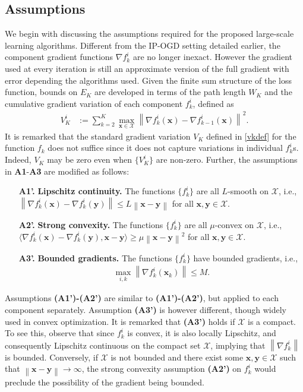 \documentclass[draftcls,onecolumn,12pt]{IEEEtran}
\theoremstyle{plain}
\def\x{\mathbf{x}}
\def\y{\mathbf{y}}
\def\cX {\mathcal{X}}
\providecommand{\norm}[1]{\left\|#1\right\|}
\providecommand{\ip}[1]{\langle#1\rangle}
\theoremstyle{plain}
\theoremstyle{remark}
\begin{document}
\subsection{Assumptions}
We begin with discussing the assumptions required for the proposed large-scale learning algorithms. Different from the IP-OGD setting detailed earlier, the component gradient functions $\nabla f_k^i$ are no longer inexact. However the gradient used at every iteration is still an approximate version of the full gradient with error depending the algorithms used. Given the finite sum structure of the loss function, bounds on $E_K$ are developed in terms of the path length $W_K$ and the cumulative gradient variation of each component $f_k^i$, defined as
\begin{align}\label{vki}
V_K^i&:=\sum\limits_{k=2}^{K}\max_{\x \in \cX}\norm{\nabla f_k^i(\x)-\nabla f_{k-1}^i(\x)}^2.
\end{align}
It is remarked that the standard gradient variation $V_K$ defined in \eqref{vkdef} for the function $f_k$ does not suffice since it does not capture variations in individual $f_k^i$s. Indeed, $V_K$ may be zero even when $\{V_K^i\}$ are non-zero. Further, the assumptions in \textbf{A1}-\textbf{A3} are modified as follows: 
\begin{itemize}
	\item[\textbf{A1'.}] \textbf{Lipschitz continuity.} The functions $\{f_k^i\}$ are all $L$-smooth on $\cX$, i.e., $\norm{\nabla f_k^i(\x)-\nabla f_k^i(\y)} \leq L\norm{\x-\y}$ for all $\x,\y \in \cX$.  
	\item[\textbf{A2'.}] \textbf{Strong convexity.} The functions $\{f_k^i\}$ are all  $\mu$-convex on $\cX$, i.e., $\ip{\nabla f_k^i(\x)-\nabla f_k^i(\y),\x-\y} \geq \mu\norm{\x-\y}^2$ for all $\x,\y \in \cX$.
	\item[\textbf{A3'.}] \textbf{Bounded gradients.} The functions $\{f_k^i\}$ have bounded gradients, i.e., 
	\begin{align}\label{eq:BVg}
	\max_{i,k}\norm{\nabla f_{k}^{i}(\x_k)} \leq M. 
	\end{align}
\end{itemize}
Assumptions \textbf{(A1')-(A2')} are similar to \textbf{(A1')-(A2')}, but applied to each component separately. Assumption \textbf{(A3')} is however different, though widely used in convex optimization. It is remarked that \textbf{(A3')} holds if $\cX$ is a compact. To see this, observe that since $f_k^i$ is convex, it is also locally Lipschitz, and consequently Lipschitz continuous on the compact set $\cX$, implying that $\norm{\nabla f_k^i}$ is bounded. Conversely, if $\cX$ is not bounded and there exist some $\x, \y \in \cX$ such that $\norm{\x-\y} \rightarrow \infty$, the strong convexity assumption \textbf{(A2')} on $f_k^i$ would preclude the possibility of the gradient being bounded.  
\end{document}
